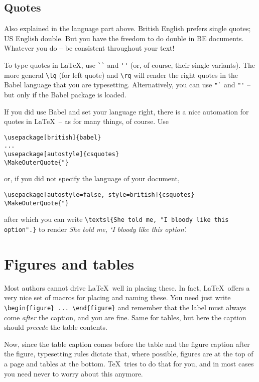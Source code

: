 \documentclass{article}
\begin{document}
\subsection{Quotes}
Also explained in the language part above.
British English prefers single quotes; US English double.  But you have the freedom to do double in BE documents.  
Whatever you do -- be consistent throughout your text!

To type quotes in \LaTeX, use \verb+``+ and \verb+''+ (or, of course, their single variants).  The more general \verb+\lq+ (for left quote) and \verb+\rq+ will render the right quotes in the Babel language that you are typesetting.  Alternatively, you can use \verb+"`+ and \verb+"'+ -- but only if the Babel package is loaded.

If you did use Babel and set your language right, there is a nice automation for quotes in \LaTeX\ -- as for many things, of course.  Use 
\begin{verbatim}
\usepackage[british]{babel}
...
\usepackage[autostyle]{csquotes}
\MakeOuterQuote{"}
\end{verbatim} 
or, if you did not specify the language of your document,
\begin{verbatim}
\usepackage[autostyle=false, style=british]{csquotes}
\MakeOuterQuote{"}
\end{verbatim} 
after which you can write \verb|\textsl{She told me, "I bloody like this option".}| to render
\textsl{She told me, `I bloody like this option'.} %



\section{Figures and tables}
Most authors cannot drive \LaTeX\ well in placing these.  In fact, \LaTeX\ offers a very nice set of macros for placing and naming these.  You need just write \verb+\begin{figure} ... \end{figure}+ and remember that the label must always come \textsl{after} the caption, and you are fine.  Same for tables, but here the caption should \textsl{precede} the table contents.

Now, since the table caption comes before the table and the figure caption after the figure, typesetting rules dictate that, where possible, figures are at the top of a page and tables at the bottom.  \TeX\ tries to do that for you, and in most cases you need never to worry about this anymore.
\end{document}
